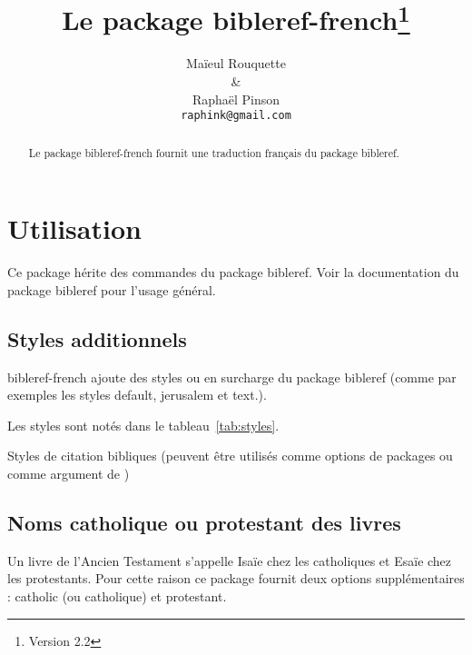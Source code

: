 \documentclass{ltxdoc}
\begin{document}
\shorthandoff{:}
\title{Le package \textsf{bibleref-french}\thanks{Version 2.2}}
\author{Ma\"ieul Rouquette \\ \& \\ Rapha\"el Pinson \\ \texttt{raphink@gmail.com}}

\maketitle
\begin{abstract}
Le  package \textsf{bibleref-french} fournit une traduction français du package \textsf{bibleref}.
\end{abstract}

\tableofcontents
\section{Utilisation}

Ce package hérite des commandes du package \textsf{bibleref}. Voir la documentation du package \textsf{bibleref} pour l'usage général.

\subsection{Styles additionnels}

\textsf{bibleref-french} ajoute des styles ou en surcharge du package \textsf{bibleref} (comme par exemples les styles \textsf{default}, \textsf{jerusalem} et \textsf{text}.).

Les styles sont notés dans le tableau~\ref{tab:styles}.

\begin{table}[tbh]
\caption{Styles de citation bibliques  (peuvent être utilisés comme options de  packages ou comme argument de  )}
\label{tab:styles}
\vspace{10pt}
\begin{center}

\end{center}
\end{table}

\subsection{Noms catholique ou protestant des livres}

Un livre de l'Ancien Testament s'appelle Isaïe chez les catholiques et Esaïe chez les protestants.
Pour cette raison ce package fournit deux options supplémentaires :  \textsf{catholic} (ou \textsf{catholique}) et \textsf{protestant}. 
\end{document}
